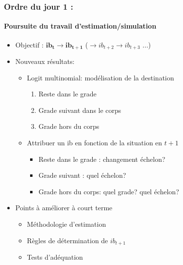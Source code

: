\documentclass[xcolor=table,ignorenonframetext,12pt]{beamer}
\newenvironment{choixmarges}[2]{\begin{list}{}{%
\setlength{\topsep}{0pt}%
\setlength{\leftmargin}{0pt}%
\setlength{\rightmargin}{0pt}%
\setlength{\listparindent}{\parindent}%
\setlength{\itemindent}{\parindent}%
\setlength{\parsep}{0pt plus 1pt}%
\addtolength{\leftmargin}{#1}%
\addtolength{\rightmargin}{#2}%
}\item }{\end{list}}
\begin{document}
\begin{frame}
\frametitle{Ordre du jour 1 : }
\framesubtitle{Poursuite du travail d'estimation/simulation}

\begin{choixmarges}{-0.5cm}{-0.5cm}
\begin{itemize}
\item Objectif : $\mathbf{ib_t \rightarrow ib_{t+1}}$ ($\rightarrow ib_{t+2} \rightarrow ib_{t+3}$ ...)

\vspace{0.2cm}
\item Nouveaux résultats:
\begin{itemize}
\item Logit multinomial: modélisation de la destination 
\begin{enumerate}
\item Reste dans le grade
\item Grade suivant dans le corps
\item Grade hors du corps
\end{enumerate}
\item Attribuer un ib en fonction de la situation en $t+1$ 
\begin{itemize}
\item Reste dans le grade : changement échelon?
\item Grade suivant : quel échelon?
\item Grade hors du corps: quel grade? quel échelon?
\end{itemize}
\end{itemize}

\vspace{0.2cm}
\item Points à améliorer à court terme
\begin{itemize}
\item Méthodologie d'estimation
\item Règles de détermination de $ib_{t+1}$
\item Tests d'adéquation
\end{itemize}

\end{itemize}

\end{choixmarges}
\end{frame}
\end{document}
